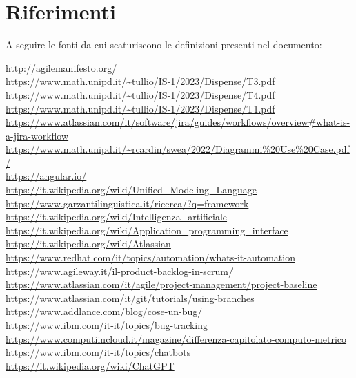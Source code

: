 \chapter{Riferimenti}\label{chap:riferimenti}
A seguire le fonti da cui scaturiscono le definizioni presenti nel documento:
\begin{small}
\begin{multicols*}{2}

\url{http://agilemanifesto.org/}\\
\url{https://www.math.unipd.it/~tullio/IS-1/2023/Dispense/T3.pdf}\\
\url{https://www.math.unipd.it/~tullio/IS-1/2023/Dispense/T4.pdf}\\
\url{https://www.math.unipd.it/~tullio/IS-1/2023/Dispense/T1.pdf}\\
\url{https://www.atlassian.com/it/software/jira/guides/workflows/overview#what-is-a-jira-workflow}\\
\url{https://www.math.unipd.it/~rcardin/swea/2022/Diagrammi%20Use%20Case.pdf/}\\
\url{https://angular.io/}\\
\url{https://it.wikipedia.org/wiki/Unified_Modeling_Language}\\
\url{https://www.garzantilinguistica.it/ricerca/?q=framework}\\
\url{https://it.wikipedia.org/wiki/Intelligenza_artificiale}\\
\url{https://it.wikipedia.org/wiki/Application_programming_interface}\\
\url{https://it.wikipedia.org/wiki/Atlassian}\\
\url{https://www.redhat.com/it/topics/automation/whats-it-automation}\\
\url{https://www.agileway.it/il-product-backlog-in-scrum/}\\
\url{https://www.atlassian.com/it/agile/project-management/project-baseline}\\
\url{https://www.atlassian.com/it/git/tutorials/using-branches}\\
\url{https://www.addlance.com/blog/cose-un-bug/}\\
\url{https://www.ibm.com/it-it/topics/bug-tracking}\\
\url{https://www.computiincloud.it/magazine/differenza-capitolato-computo-metrico}\\
\url{https://www.ibm.com/it-it/topics/chatbots}\\
\url{https://it.wikipedia.org/wiki/ChatGPT}\\

\end{multicols*}
\end{small}
